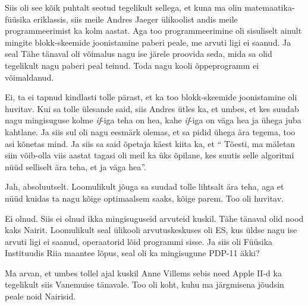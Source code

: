 
Siis oli see kõik puhtalt seotud tegelikult sellega, et kuna ma olin matemaatika-füüsika eriklassis, siis meile Andres Jaeger ülikoolist andis meile programmeerimist ka kolm aastat. Aga too programmeerimine oli sisuliselt ainult mingite blokk-skeemide joonistamine paberi peale, me arvuti ligi ei saanud. Ja seal Tähe tänaval oli võimalus nagu ise järele proovida  seda, mida sa olid tegelikult nagu paberi peal teinud. Toda nagu kooli õppeprogramm ei võimaldanud.


Ei, ta ei tapnud kindlasti tolle pärast, et ka too blokk-skeemide joonistamine oli huvitav. Kui sa tolle ülesande said, siis Andres ütles ka, et umbes, et kes suudab nagu mingisuguse kolme \emph{if}-iga teha on hea, kahe \emph{if}-iga on väga hea ja ühega juba kahtlane. Ja siis sul oli nagu eesmärk olemas, et sa pidid ühega ära tegema, too asi kõnetas mind. Ja siis sa said õpetaja käest kiita ka, et \enquote{ Tõesti, ma mäletan siin võib-olla viis aastat tagasi oli meil ka üks õpilane, kes suutis  selle algoritmi nüüd selliselt ära teha, et ja väga hea}.


Jah, absoluutselt. Loomulikult jõuga sa suudad tolle  lihtsalt ära teha, aga et nüüd kuidas ta nagu kõige optimaalsem saaks, kõige parem. Too oli huvitav.


Ei olnud. Siis ei olnud ikka mingisuguseid arvuteid kuskil. Tähe tänaval olid nood kaks Nairit. Loomulikult seal ülikooli arvutuskeskuses oli ES, kus üldse nagu ise arvuti ligi ei saanud,  operaatorid lõid programmi sisse. Ja siis oli Füüsika Instituudis Riia maantee lõpus, seal oli ka mingisugune PDP-11 äkki?

Ma arvan, et umbes tollel ajal kuskil Anne Villems sebis need Apple II-d ka tegelikult siis Vanemuise tänavale. Too oli koht, kuhu ma järgmisena jõudsin peale noid Nairisid.  


